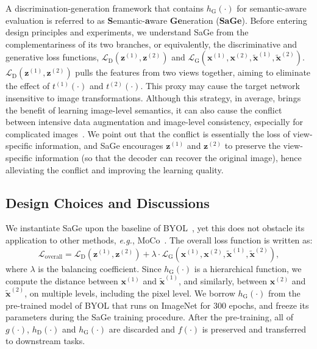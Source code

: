 \documentclass[10pt,twocolumn,letterpaper]{article}
\begin{document}
A discrimination-generation framework that contains $h_\mathrm{G}(\cdot)$ for semantic-aware evaluation is referred to as \textbf{S}emantic-\textbf{a}ware \textbf{Ge}neration (\textbf{SaGe}). Before entering design principles and experiments, we understand SaGe from the complementariness of its two branches, or equivalently, the discriminative and generative loss functions, $\mathcal{L}_\mathrm{D}(\mathbf{z}^{(1)},\mathbf{z}^{(2)})$ and $\mathcal{L}_\mathrm{G}(\mathbf{x}^{(1)},\mathbf{x}^{(2)},\tilde{\mathbf{x}}^{(1)},\tilde{\mathbf{x}}^{(2)})$. $\mathcal{L}_\mathrm{D}(\mathbf{z}^{(1)},\mathbf{z}^{(2)})$ pulls the features from two views together, aiming to eliminate the effect of $t^{(1)}(\cdot)$ and $t^{(2)}(\cdot)$. This proxy may cause the target network insensitive to image transformations. Although this strategy, in average, brings the benefit of learning image-level semantics, it can also cause the conflict between intensive data augmentation and image-level consistency, especially for complicated images~\cite{wang2021dense, pixpro}. We point out that the conflict is essentially the loss of view-specific information, and SaGe encourages $\mathbf{z}^{(1)}$ and $\mathbf{z}^{(2)}$ to preserve the view-specific information (so that the decoder can recover the original image), hence alleviating the conflict and improving the learning quality.

\subsection{Design Choices and Discussions}
\label{approach:design}

We instantiate SaGe upon the baseline of BYOL~\cite{grill2020bootstrap}, yet this does not obstacle its application to other methods, \textit{e.g.}, MoCo~\cite{he2020momentum}. The overall loss function is written as:
\begin{equation}
\mathcal{L}_\mathrm{overall}=\mathcal{L}_\mathrm{D}(\mathbf{z}^{(1)},\mathbf{z}^{(2)})+\lambda\cdot\mathcal{L}_\mathrm{G}(\mathbf{x}^{(1)},\mathbf{x}^{(2)},\tilde{\mathbf{x}}^{(1)},\tilde{\mathbf{x}}^{(2)}),
\end{equation}
where $\lambda$ is the balancing coefficient. Since $h_\mathrm{G}(\cdot)$ is a hierarchical function, we compute the distance between $\mathbf{x}^{(1)}$ and $\tilde{\mathbf{x}}^{(1)}$, and similarly, between $\mathbf{x}^{(2)}$ and $\tilde{\mathbf{x}}^{(2)}$, on multiple levels, including the pixel level. We borrow $h_\mathrm{G}(\cdot)$ from the pre-trained model of BYOL that runs on ImageNet for $300$ epochs, and freeze its parameters during the SaGe training procedure. After the pre-training, all of $g(\cdot)$, $h_\mathrm{D}(\cdot)$ and $h_\mathrm{G}(\cdot)$ are discarded and $f(\cdot)$ is preserved and transferred to downstream tasks.
\end{document}
